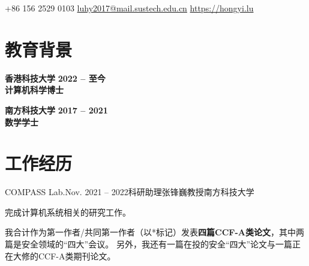 \documentclass{resume}
\begin{document}
\begin{center}
	\contact
	{+86 156 2529 0103}
	{\href{mailto://luhy2017@mail.sustech.edu.cn}{luhy2017@mail.sustech.edu.cn}}
	{\href{https://hongyi.lu}{https://hongyi.lu}}
\end{center}

\section{\textbf{教育背景}}
\begin{content}
	{\textbf{香港科技大学}}
	\hfill {\textbf{2022 -- 至今}}
	\\ \textbf{计算机科学博士}

	\textbf{南方科技大学} \hfill \textbf{2017 -- 2021} \\
	\textbf{数学学士} \hfill

	\sectionlineskip
\end{content}

\section{\textbf{工作经历}}
\begin{content}

	\begin{position}{COMPASS Lab.}{Nov. 2021 -- 2022}{科研助理}{张锋巍教授}{南方科技大学}
		\item 完成计算机系统相关的研究工作。
	\end{position}

	\sectionlineskip
\end{content}
\vspace{-3\medskipamount}

\noindent
\renewcommand{\refname}{\textbf{学术发表}}   %
\nocite{*}
\sectionlineskip

我合计作为第一作者/共同第一作者（以*标记）发表\textbf{四篇CCF-A类论文}，其中两篇是安全领域的“四大”会议。
另外，我还有一篇在投的安全“四大”论文与一篇正在大修的CCF-A类期刊论文。
\end{document}
